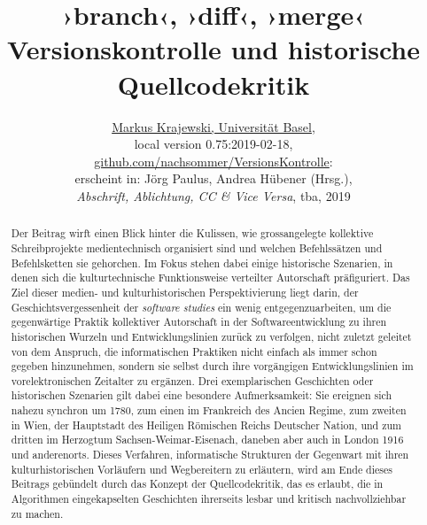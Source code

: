 \documentclass[a4paper,11pt]{article}
\date{}
\newcommand{\inanf}[1]{›#1‹}
\begin{document}
%
% 
\title{\Huge\inanf{branch}, \inanf{diff}, \inanf{merge}\\
\large Versionskontrolle und historische Quellcodekritik}
\author{\href{http://gtm.mewi.unibas.ch}{Markus Krajewski, Universität Basel},\\[3mm]
local version 0.75:2019-02-18,\\
\href{https://github.com/nachsommer/VersionsKontrolle/tree/master/1.Fassung}{github.com/nachsommer/VersionsKontrolle}: \gitVer{}\\[3mm]
erscheint in: Jörg Paulus, Andrea Hübener (Hrsg.),\\
\emph{Abschrift, Ablichtung, CC \& Vice Versa}, tba, 2019}
\maketitle
\tableofcontents
%
\begin{abstract}
\noindent Der Beitrag wirft einen Blick hinter die Kulissen, wie grossangelegte kollektive Schreibprojekte medientechnisch organisiert sind und welchen Befehlssätzen und Befehlsketten sie gehorchen. Im Fokus stehen dabei einige historische Szenarien, in denen sich die kulturtechnische Funktionsweise verteilter Autorschaft präfiguriert. Das Ziel dieser medien- und kulturhistorischen Perspektivierung liegt darin, der Geschichtsvergessenheit der \emph{software studies} ein wenig entgegenzuarbeiten, um die gegenwärtige Praktik kollektiver Autorschaft in der Softwareentwicklung zu ihren historischen Wurzeln und Entwicklungslinien zurück zu verfolgen, nicht zuletzt geleitet von dem Anspruch, die informatischen Praktiken nicht einfach als immer schon gegeben hinzunehmen, sondern sie selbst durch ihre vorgängigen Entwicklungslinien im vorelektronischen Zeitalter zu ergänzen. Drei exemplarischen Geschichten oder historischen Szenarien gilt dabei eine besondere Aufmerksamkeit: Sie ereignen sich nahezu synchron um 1780, zum einen im Frankreich des Ancien Regime, zum zweiten in Wien, der Hauptstadt des Heiligen Römischen Reichs Deutscher Nation, und zum dritten im Herzogtum Sachsen-Weimar-Eisenach, daneben aber auch in London 1916 und anderenorts. Dieses Verfahren, informatische Strukturen der Gegenwart mit ihren kulturhistorischen Vorläufern und Wegbereitern zu erläutern, wird am Ende dieses Beitrags gebündelt durch das Konzept der Quellcodekritik, das es erlaubt, die in Algorithmen eingekapselten Geschichten ihrerseits lesbar und kritisch nachvollziehbar zu machen. 
\end{abstract}
\end{document}
